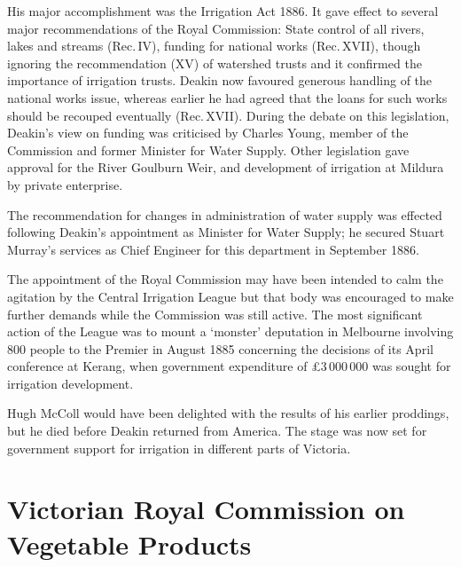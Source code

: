 His major accomplishment was the Irrigation Act
 1886. It gave effect to
several major recommendations of the Royal Commission: State control
of all rivers, lakes and streams (Rec.\,IV), funding for national
works (Rec.\,XVII), though ignoring the recommendation (XV) of
watershed trusts and it confirmed the importance of irrigation trusts.
Deakin now favoured generous handling of the national works issue,
whereas earlier he had agreed that the loans for such works should be
recouped eventually (Rec.\,XVII).  During the debate on this
legislation, Deakin's view on funding was criticised by Charles Young,
 member of the Commission and former Minister for
Water Supply.  Other legislation gave approval for the River Goulburn
Weir, and development of irrigation at Mildura 
by private enterprise.

The recommendation for changes in administration of water supply was
effected following Deakin's appointment as Minister for Water Supply;
he secured Stuart Murray's  services as Chief
Engineer for this department in September 1886.

The appointment of the Royal Commission may have been intended to calm
the agitation by the Central Irrigation League
 but that body was
encouraged to make further demands while the Commission was still
active.  The most significant action of the League was to mount a
`monster' deputation in Melbourne involving 800 people to the Premier
in August 1885 concerning the decisions of its April conference at
Kerang,  when government expenditure of
\pounds3\,000\,000 was sought for irrigation
development.

Hugh McColl would have been delighted with the results of his earlier
proddings, but he died before Deakin returned from
America.  The stage was now set for government support
for irrigation in different parts of Victoria.

\section*{Victorian Royal Commission on Vegetable Products}

